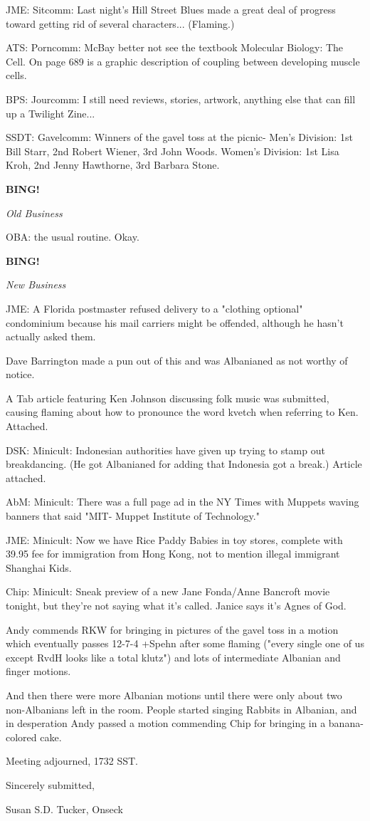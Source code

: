 \documentclass[12pt]{article}
\newcommand{\bing}{{\bf BING!} }
\newcommand{\goto}[1]{\bing \vskip 12pt \centerline{{\em{#1}}}}
\begin{document}
JME: Sitcomm: Last night's Hill Street Blues made a great deal of progress toward getting rid of several characters... (Flaming.)

ATS: Porncomm: McBay better not see the textbook Molecular Biology: The Cell. On page 689 is a graphic description of coupling between developing muscle cells.

BPS: Jourcomm: I still need reviews, stories, artwork, anything else that can fill up a Twilight Zine...

SSDT: Gavelcomm: Winners of the gavel toss at the picnic- Men's Division: 1st Bill Starr, 2nd Robert Wiener, 3rd John Woods. Women's Division: 1st Lisa Kroh, 2nd Jenny Hawthorne, 3rd Barbara Stone.

\goto{Old Business}

OBA: the usual routine. Okay.

\goto{New Business}

JME: A Florida postmaster refused delivery to a "clothing optional" condominium because his mail carriers might be offended, although he hasn't actually asked them.

Dave Barrington made a pun out of this and was Albanianed as not worthy of notice.

A Tab article featuring Ken Johnson discussing folk music was submitted, causing flaming about how to pronounce the word kvetch when referring to Ken. Attached.

DSK: Minicult: Indonesian authorities have given up trying to stamp out breakdancing. (He got Albanianed for adding that Indonesia got a break.) Article attached.

AbM: Minicult: There was a full page ad in the NY Times with Muppets waving banners that said "MIT- Muppet Institute of Technology."

JME: Minicult: Now we have Rice Paddy Babies in toy stores, complete with 39.95 fee for immigration from Hong Kong, not to mention illegal immigrant Shanghai Kids.

Chip: Minicult: Sneak preview of a new Jane Fonda/Anne Bancroft movie tonight, but they're not saying what it's called. Janice says it's Agnes of God.

Andy commends RKW for bringing in pictures of the gavel toss in a motion which eventually passes 12-7-4 +Spehn after some flaming ("every single one of us except RvdH looks like a total klutz") and lots of intermediate Albanian and finger motions.

And then there were more Albanian motions until there were only about two non-Albanians left in the room. People started singing Rabbits in Albanian, and in desperation Andy passed a motion commending Chip for bringing in a banana-colored cake.

\vspace{12pt}

\noindent
Meeting adjourned, 1732 SST.

\vspace{18pt}

\centerline{Sincerely submitted,}
\centerline{Susan S.D. Tucker, Onseck}
\end{document}
